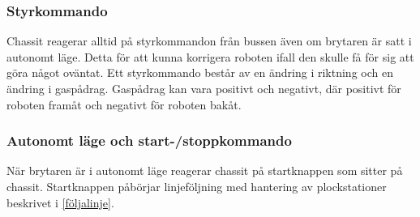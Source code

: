 \subsubsection{Styrkommando}

Chassit reagerar alltid på styrkommandon från bussen även om brytaren är satt i autonomt läge. Detta för att kunna korrigera roboten ifall den skulle få för sig att göra något oväntat. Ett styrkommando består av en ändring i riktning och en ändring i gaspådrag. Gaspådrag kan vara positivt och negativt, där positivt för roboten framåt och negativt för roboten bakåt. 


\subsubsection{Autonomt läge och start-/stoppkommando}

När brytaren är i autonomt läge reagerar chassit på startknappen som sitter på chassit. Startknappen påbörjar linjeföljning med hantering av plockstationer beskrivet i \ref{följalinje}.




